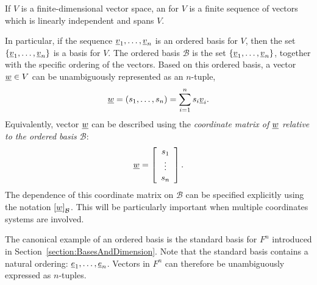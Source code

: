 \begin{definition}
If $V$ is a finite-dimensional vector space, an  for $V$ is a finite sequence of vectors which is linearly independent and spans $V$.
\end{definition}

In particular, if the sequence $\underline{v}_1, \ldots, \underline{v}_n$ is an ordered basis for $V$, then the set $\left\{ \underline{v}_1, \ldots, \underline{v}_n \right\}$ is a basis for $V$.
The ordered basis $\mathcal{B}$ is the set $\left\{ \underline{v}_1, \ldots, \underline{v}_n \right\}$, together with the specific ordering of the vectors.
Based on this ordered basis, a vector $\underline{w} \in V$ can be unambiguously represented as an $n$-tuple,
\begin{equation*}
\underline{w} = (s_1, \ldots, s_n) = \sum_{i=1}^n s_i \underline{v}_i.
\end{equation*}
Equivalently, vector $\underline{w}$ can be described using the \emph{coordinate matrix of $\underline{w}$ relative to the ordered basis $\mathcal{B}$}:
\begin{equation*}
\underline{w} = \left[ \begin{array}{c} s_1 \\ \vdots \\ s_n \end{array} \right].
\end{equation*}
The dependence of this coordinate matrix on $\mathcal{B}$ can be specified explicitly using the notation $\left[ \underline{w} \right]_{\mathcal{B}}$.
This will be particularly important when multiple coordinates systems are involved.

\begin{example}
The canonical example of an ordered basis is the standard basis for $F^n$ introduced in Section~\ref{section:BasesAndDimension}.
Note that the standard basis contains a natural ordering: $\underline{e}_1, \ldots, \underline{e}_n$.
Vectors in $F^n$ can therefore be unambiguously expressed as $n$-tuples.
\end{example}

